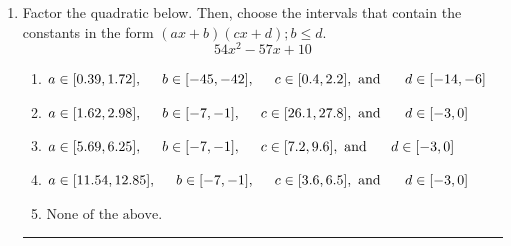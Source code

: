 \documentclass[14pt]{extbook}
\newcommand{\litem}[1]{\item#1\hspace*{-1cm}\rule{\textwidth}{0.4pt}}
\begin{document}
\begin{enumerate}
{\begin{enumerate}[label=\Alph*.]
\end{enumerate} }
\litem{
Factor the quadratic below. Then, choose the intervals that contain the constants in the form $(ax+b)(cx+d); b \leq d.$\[ 54x^{2} -57 x + 10 \]\begin{enumerate}[label=\Alph*.]
\item \( a \in [0.39, 1.72], \hspace*{5mm} b \in [-45, -42], \hspace*{5mm} c \in [0.4, 2.2], \text{ and } \hspace*{5mm} d \in [-14, -6] \)
\item \( a \in [1.62, 2.98], \hspace*{5mm} b \in [-7, -1], \hspace*{5mm} c \in [26.1, 27.8], \text{ and } \hspace*{5mm} d \in [-3, 0] \)
\item \( a \in [5.69, 6.25], \hspace*{5mm} b \in [-7, -1], \hspace*{5mm} c \in [7.2, 9.6], \text{ and } \hspace*{5mm} d \in [-3, 0] \)
\item \( a \in [11.54, 12.85], \hspace*{5mm} b \in [-7, -1], \hspace*{5mm} c \in [3.6, 6.5], \text{ and } \hspace*{5mm} d \in [-3, 0] \)
\item \( \text{None of the above.} \)


\end{enumerate}}
\end{enumerate}
\end{document}
